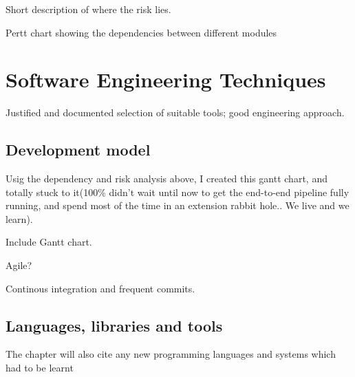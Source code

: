 \documentclass[12pt,a4paper,twoside,openright]{report}
\theoremstyle{definition}
\begin{document}
\par
Short description of where the risk lies. 
\par
Pertt chart showing the dependencies between different modules


\section{Software Engineering Techniques}
Justified and documented selection of suitable tools; good engineering approach.


\subsection{Development model}

Usig the dependency and risk analysis above, I created this gantt chart, and totally stuck to it(100\% didn't wait until now to get the end-to-end pipeline fully running, and spend most of the time in an extension rabbit hole.. We live and we learn).

Include Gantt chart.

Agile? 

Continous integration and frequent commits.

\subsection{Languages, libraries and tools}
The chapter will also cite any new programming languages and systems which had to be learnt 
\end{document}
